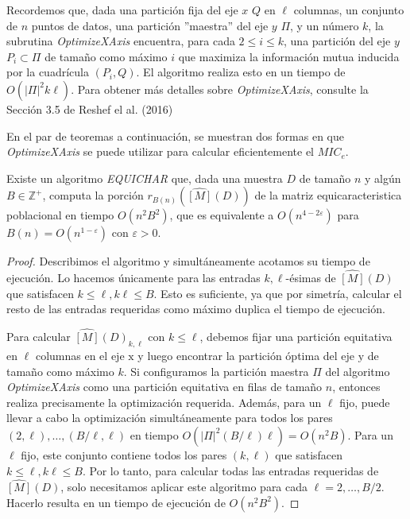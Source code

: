        Recordemos que, dada una partici\'on fija del eje $x$ $Q$ en $\ell$ columnas, un conjunto de $n$ puntos de datos, una partici\'on ''maestra'' del eje $y$ $\Pi$, y un n\'umero $k$, la subrutina \textit{OptimizeXAxis} encuentra, para cada $2 \leq i \leq k$, una partici\'on del eje $y$ $P_i \subset \Pi $ de tama\~no como m\'aximo $i$ que maximiza la informaci\'on mutua inducida por la cuadr\'icula $(P_i, Q)$. El algoritmo realiza esto en un tiempo de $O(|\Pi|^2k\ell)$. Para obtener m\'as detalles sobre \textit{OptimizeXAxis}, consulte la Secci\'on 3.5 de Reshef el al. (2016) \cite{Reshef2016} 
    
        En el par de teoremas a continuaci\'on, se muestran dos formas en que \textit{OptimizeXAxis} se puede utilizar para calcular eficientemente el $MIC_e$. 
    
        \begin{thm}
    
            Existe un algoritmo  \textit{EQUICHAR} que, dada una muestra $D$ de tama\~no $n$ y alg\'un $B \in \mathbb{Z}^{+}$, computa la porci\'on $r_{B(n)}(\widehat{[M]}(D))$ de la matriz equicaracteristica poblacional en tiempo $O\left(n^2 B^2\right)$, que es equivalente a $O\left(n^{4-2 \varepsilon}\right)$ para $B(n)=O\left(n^{1-\varepsilon}\right)$ con $\varepsilon>0$.
        \end{thm}
    
        \begin{proof}
            Describimos el algoritmo y simult\'aneamente acotamos su tiempo de ejecuci\'on. Lo hacemos \'unicamente para las entradas $k, \ell$-\'esimas de $\widehat{[M]}(D)$ que satisfacen $k \leq \ell, k \ell \leq B$. Esto es suficiente, ya que por simetr\'ia, calcular el resto de las entradas requeridas como m\'aximo duplica el tiempo de ejecuci\'on.
    
            Para calcular $\widehat{[M]}(D)_{k, \ell}$ con $k \leq \ell$, debemos fijar una partici\'on equitativa en $\ell$ columnas en el eje $\mathrm{x}$ y luego encontrar la partici\'on \'optima del eje $\mathrm{y}$ de tama\~no como m\'aximo $k$. Si configuramos la partici\'on maestra $\Pi$ del algoritmo \textit{OptimizeXAxis} como una partici\'on equitativa en filas de tama\~no $n$, entonces realiza precisamente la optimizaci\'on requerida. Adem\'as, para un $\ell$ fijo, puede llevar a cabo la optimizaci\'on simult\'aneamente para todos los pares ${(2, \ell), \ldots,(B / \ell, \ell)}$ en tiempo $O\left(|\Pi|^2(B / \ell) \ell\right)=O\left(n^2 B\right)$. Para un $\ell$ fijo, este conjunto contiene todos los pares $(k, \ell)$ que satisfacen $k \leq \ell, k \ell \leq B$. Por lo tanto, para calcular todas las entradas requeridas de $\widehat{[M]}(D)$, solo necesitamos aplicar este algoritmo para cada $\ell=2, \ldots, B / 2$. Hacerlo resulta en un tiempo de ejecuci\'on de $O\left(n^2 B^2\right)$.
        \end{proof}
    

